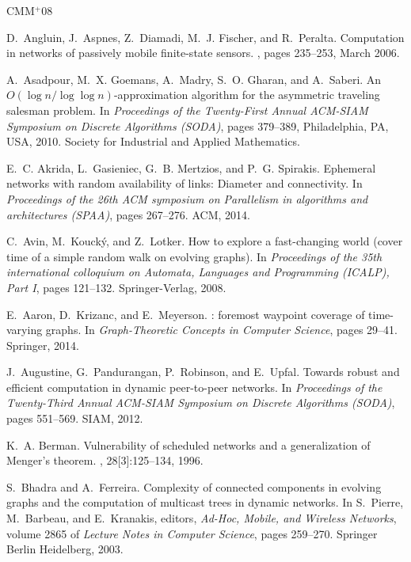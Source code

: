 \documentclass[oribibl, 11pt]{llncs}
\begin{document}
\newcommand{\etalchar}[1]{$^{#1}$}
\begin{thebibliography}{CMM{\etalchar{+}}08}

\bibitem[AAD{\etalchar{+}}06]{AADFP06}
D.~Angluin, J.~Aspnes, Z.~Diamadi, M.~J. Fischer, and R.~Peralta.
\newblock Computation in networks of passively mobile finite-state sensors.
, pages 235--253, March 2006.

\bibitem[AGM{\etalchar{+}}10]{AGMGS10}
A.~Asadpour, M.~X. Goemans, A.~Madry, S.~O. Gharan, and A.~Saberi.
\newblock An {$O(\log n/ \log \log n)$}-approximation algorithm for the
  asymmetric traveling salesman problem.
\newblock In {\em Proceedings of the Twenty-First Annual ACM-SIAM Symposium on
  Discrete Algorithms (SODA)}, pages 379--389, Philadelphia, PA, USA, 2010.
  Society for Industrial and Applied Mathematics.

E.~C. Akrida, L.~Gasieniec, G.~B. Mertzios, and P.~G. Spirakis.
\newblock Ephemeral networks with random availability of links: Diameter and
  connectivity.
\newblock In {\em Proceedings of the 26th ACM symposium on Parallelism in
  algorithms and architectures (SPAA)}, pages 267--276. ACM, 2014.

C.~Avin, M.~Kouck\'{y}, and Z.~Lotker.
\newblock How to explore a fast-changing world (cover time of a simple random
  walk on evolving graphs).
\newblock In {\em Proceedings of the 35th international colloquium on Automata,
  Languages and Programming (ICALP), Part I}, pages 121--132. Springer-Verlag,
  2008.

E.~Aaron, D.~Krizanc, and E.~Meyerson.
: foremost waypoint coverage of time-varying graphs.
\newblock In {\em Graph-Theoretic Concepts in Computer Science}, pages 29--41.
  Springer, 2014.

J.~Augustine, G.~Pandurangan, P.~Robinson, and E.~Upfal.
\newblock Towards robust and efficient computation in dynamic peer-to-peer
  networks.
\newblock In {\em Proceedings of the Twenty-Third Annual ACM-SIAM Symposium on
  Discrete Algorithms (SODA)}, pages 551--569. SIAM, 2012.

K.~A. Berman.
\newblock Vulnerability of scheduled networks and a generalization of
  {M}enger's theorem.
, 28[3]:125--134, 1996.

S.~Bhadra and A.~Ferreira.
\newblock Complexity of connected components in evolving graphs and the
  computation of multicast trees in dynamic networks.
\newblock In S.~Pierre, M.~Barbeau, and E.~Kranakis, editors, {\em Ad-Hoc,
  Mobile, and Wireless Networks}, volume 2865 of {\em Lecture Notes in Computer
  Science}, pages 259--270. Springer Berlin Heidelberg, 2003.


\end{thebibliography}
\end{document}
